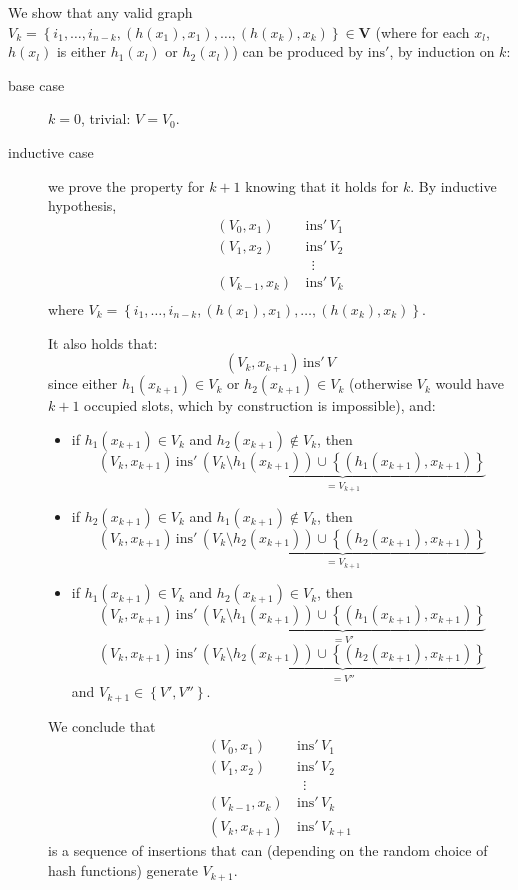 \documentclass[a4paper, 12pt]{article}
\begin{document}
\begin{enumerate}
  We show that any valid graph \(V_{k} = \left\{ i_1, \dots, i_{n-k}, (h(x_1), x_{1}), \dots, (h(x_{k}), x_{k}) \right\} \in \mathbf{V}\) (where for each \(x_{l}\), \(h(x_{l})\) is either \(h_1(x_{l})\) or \(h_2(x_{l})\)) can be produced by \(\mathrm{ins'}\), by induction on \(k\):
  \begin{description}
  \item[base case] \(k = 0\), trivial: \(V = V_0\).
  \item[inductive case] we prove the property for \(k+1\) knowing that it holds for \(k\). By inductive hypothesis,
    \begin{align*}
      (V_0, x_1)\,&\mathrm{ins'}\,V_1 \\
      (V_1, x_2)\,&\mathrm{ins'}\,V_2 \\
                  &\;\,\vdots \\
      (V_{k-1}, x_k)\,&\mathrm{ins'}\,V_{k} \\
    \end{align*}
    where \(V_{k} = \left\{ i_{1}, \dots, i_{n-k}, (h(x_1), x_{1}), \dots, (h(x_{k}), x_{k}) \right\}\).

    It also holds that:
    \[ (V_{k}, x_{k+1})\,\mathrm{ins'}\,V \]
    since either \(h_1(x_{k+1}) \in V_{k}\) or \(h_2(x_{k+1}) \in V_{k}\) (otherwise \(V_{k}\) would have \(k+1\) occupied slots, which by construction is impossible), and:
    \begin{itemize}
    \item if \(h_1(x_{k+1}) \in V_{k}\) and \(h_2(x_{k+1}) \notin V_{k}\), then
      \[ (V_{k}, x_{k+1})\,\mathrm{ins'}\,\underbrace{(V_{k} \setminus h_1(x_{k+1})) \cup \left\{ (h_1(x_{k+1}), x_{k+1}) \right\}}_{=V_{k+1}}
      \]
    \item if \(h_2(x_{k+1}) \in V_{k}\) and \(h_1(x_{k+1}) \notin V_{k}\), then
      \[ (V_{k}, x_{k+1})\,\mathrm{ins'}\,\underbrace{(V_{k} \setminus h_2(x_{k+1})) \cup \left\{ (h_2(x_{k+1}), x_{k+1}) \right\}}_{=V_{k+1}}
      \]
    \item if \(h_1(x_{k+1}) \in V_{k}\) and \(h_2(x_{k+1}) \in V_{k}\), then
      \[ (V_{k}, x_{k+1})\,\mathrm{ins'}\,\underbrace{(V_{k} \setminus h_1(x_{k+1})) \cup \left\{ (h_1(x_{k+1}), x_{k+1}) \right\}}_{=V'} \]
      \[ (V_{k}, x_{k+1})\,\mathrm{ins'}\,\underbrace{(V_{k} \setminus h_2(x_{k+1})) \cup \left\{ (h_2(x_{k+1}), x_{k+1}) \right\}}_{=V''} \]
      and \(V_{k+1} \in \left\{ V', V'' \right\}\).
    \end{itemize}

    We conclude that
    \begin{align*}
      (V_0, x_1)\,&\mathrm{ins'}\,V_1 \\
      (V_1, x_2)\,&\mathrm{ins'}\,V_2 \\
                  &\;\,\vdots \\
      (V_{k-1}, x_k)\,&\mathrm{ins'}\,V_{k} \\
      (V_{k}, x_{k+1})\,&\mathrm{ins'}\,V_{k+1}
    \end{align*}
    is a sequence of insertions that can (depending on the random choice of hash functions) generate \(V_{k+1}\).
  \end{description}

\end{enumerate}
\end{document}
